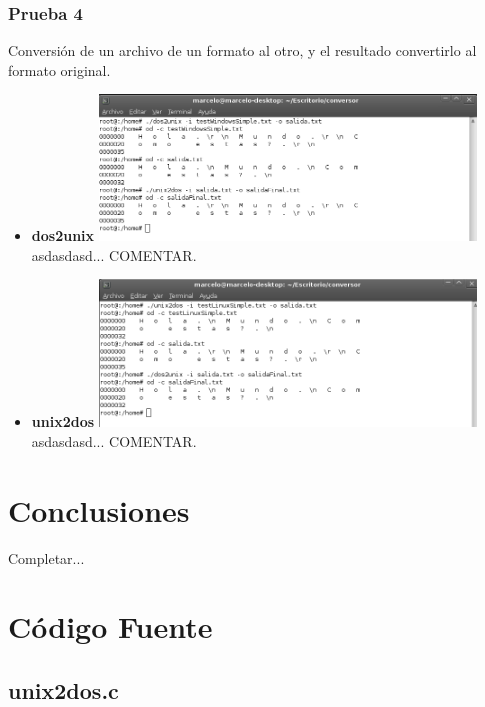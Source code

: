 \documentclass[a4paper,10pt]{article}
\begin{document}
    \subsubsection{Prueba 4}
    Conversi\'on de un archivo de un formato al otro, y el resultado convertirlo al formato original.
      \begin{itemize}
      \item \textbf{dos2unix}
      \newline
      \includegraphics[width=10cm, viewport=0 0 842 237]{../Informe/Imagenes/prueba4-archivo-dos2unix.png}
      \newline	
      asdasdasd... COMENTAR.
      \item \textbf{unix2dos}
      \newline
      \includegraphics[width=10cm, viewport=0 0 838 328]{../Informe/Imagenes/prueba4-archivo-unix2dos.png}	
      \newline
      asdasdasd... COMENTAR.
      \end{itemize}

\section{Conclusiones}
Completar...


\appendix
\newpage
\section{C\'odigo Fuente}
  \subsection{unix2dos.c}
    \lstset{numbers=left, frame=single, breaklines=true}
    
\end{document}
